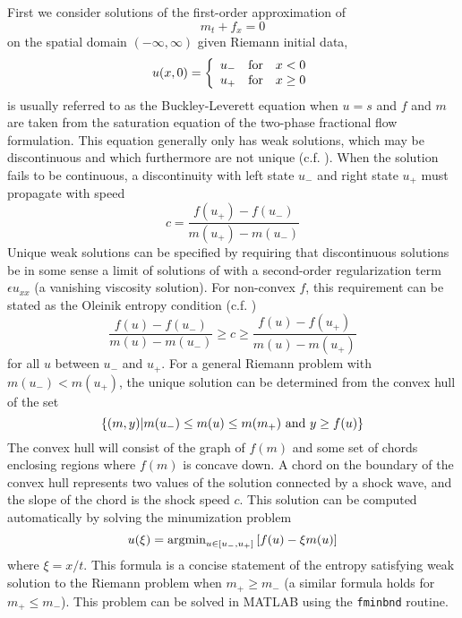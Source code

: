 \documentclass[10pt,dvips,twoside,reqno]{amsart}
\begin{document}
First we consider solutions of the first-order approximation of
\begin{equation}
  \label{eq:bl}
  m_t + f_x = 0
\end{equation}
on the spatial domain $(-\infty,\infty)$ given Riemann initial data,
\begin{eqnarray}
\label{eq:riemannData}
u(x,0) = \left\{ \begin{array}{lr}
u_- & \mbox{for}\quad x < 0 \\
u_+ & \mbox{for}\quad x \geq 0
\end{array} \right.
\end{eqnarray}
 is usually referred to as the Buckley-Leverett equation when
$u=s$ and $f$ and $m$ are taken from the saturation equation of the
two-phase fractional flow formulation. This equation generally only
has weak solutions, which may be discontinuous and which furthermore
are not unique (c.f. \citep{Evans_98,Leveque_90}). When the solution
fails to be continuous, a discontinuity with left state $u_-$ and
right state $u_+$ must propagate with speed
\begin{equation}
  \label{eq:rhcondition}
  c = \frac{f(u_+) - f(u_-)}{m(u_+) - m(u_-)}
\end{equation}
Unique weak solutions can be specified by requiring that discontinuous
solutions be in some sense a limit of solutions of  with a
second-order regularization term $\epsilon u_{xx}$ (a vanishing
viscosity solution).  For non-convex $f$, this requirement can be
stated as the Oleinik entropy condition \citep{Oleinik_57} (c.f.
\citep{Osher_84,Leveque_90})
\begin{equation}
  \label{eq:oleinik}
  \frac{f(u) - f(u_-)}{m(u) - m(u_-)} \geq c \geq  \frac{f(u) - f(u_+)}{m(u) - m(u_+)}
\end{equation}
for all $u$ between $u_-$ and $u_+$. For a general Riemann problem
with $m(u_-) < m(u_+)$, the unique solution can be determined from the
convex hull of the set
\begin{equation}
  \label{eq:chull}
  \left\{ (m,y) | m(u_-) \leq m(u) \leq m(m_+) \mbox{ and } y \geq f(u) \right\}
\end{equation}
The convex hull will consist of the graph of $f(m)$ and some set of
chords enclosing regions where $f(m)$ is concave down. A chord on the
boundary of the convex hull represents two values of the solution
connected by a shock wave, and the slope of the chord is the shock
speed $c$. This solution can be computed automatically by solving the
minumization problem \citep{Osher_84}
\begin{equation}
  \label{eq:osherSol}
  u(\xi) = \mbox{argmin}_{u \in [u_-,u_+]} \left[ f(u) - \xi m(u) \right] 
\end{equation}
where $\xi = x/t$. This formula is a concise statement of the entropy
satisfying weak solution to the Riemann problem when $m_+ \geq m_-$ (a
similar formula holds for $m_+ \leq m_-$). This problem can be solved
in MATLAB using the \texttt{fminbnd} routine.
\end{document}
